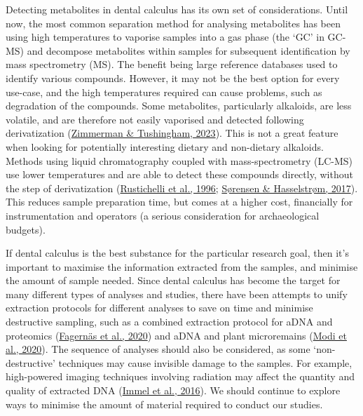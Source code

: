 \documentclass[
  b5paper,
]{book}
\begin{document}
Detecting metabolites in dental calculus has its own set of
considerations. Until now, the most common separation method for
analysing metabolites has been using high temperatures to vaporise
samples into a gas phase (the `GC' in GC-MS) and decompose metabolites
within samples for subsequent identification by mass spectrometry (MS).
The benefit being large reference databases used to identify various
compounds. However, it may not be the best option for every use-case,
and the high temperatures required can cause problems, such as
degradation of the compounds. Some metabolites, particularly alkaloids,
are less volatile, and are therefore not easily vaporised and detected
following derivatization
(\protect\hyperlink{ref-zimmermanBiomolecularArchaeology2023}{Zimmerman
\& Tushingham, 2023}). This is not a great feature when looking for
potentially interesting dietary and non-dietary alkaloids. Methods using
liquid chromatography coupled with mass-spectrometry (LC-MS) use lower
temperatures and are able to detect these compounds directly, without
the step of derivatization
(\protect\hyperlink{ref-rustichelliSimultaneousSeparation1996}{Rustichelli
et al., 1996};
\protect\hyperlink{ref-sorensenSensitiveDetermination2017}{Sørensen \&
Hasselstrøm, 2017}). This reduces sample preparation time, but comes at
a higher cost, financially for instrumentation and operators (a serious
consideration for archaeological budgets).

If dental calculus is the best substance for the particular research
goal, then it's important to maximise the information extracted from the
samples, and minimise the amount of sample needed. Since dental calculus
has become the target for many different types of analyses and studies,
there have been attempts to unify extraction protocols for different
analyses to save on time and minimise destructive sampling, such as a
combined extraction protocol for aDNA and proteomics
(\protect\hyperlink{ref-fagernasUnifiedProtocol2020}{Fagernäs et al.,
2020}) and aDNA and plant microremains
(\protect\hyperlink{ref-modiCalculusMethodologies2020}{Modi et al.,
2020}). The sequence of analyses should also be considered, as some
`non-destructive' techniques may cause invisible damage to the samples.
For example, high-powered imaging techniques involving radiation may
affect the quantity and quality of extracted DNA
(\protect\hyperlink{ref-immelEffectXray2016}{Immel et al., 2016}). We
should continue to explore ways to minimise the amount of material
required to conduct our studies.
\end{document}
